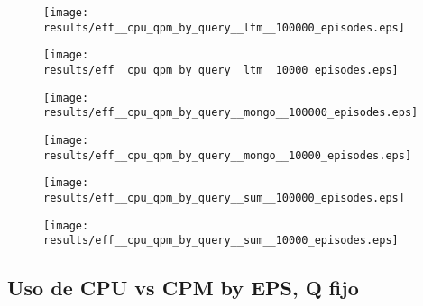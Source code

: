 \begin{figure}[H]
	\centering
	\texttt{[image: results/eff\_\_cpu\_qpm\_by\_query\_\_ltm\_\_100000\_episodes.eps]}
	\caption[]
	{\small }
	\label{img:result_eff__cpu_qpm_by_query__ltm__100000_episodes}
\end{figure}
\begin{figure}[H]
	\centering
	\texttt{[image: results/eff\_\_cpu\_qpm\_by\_query\_\_ltm\_\_10000\_episodes.eps]}
	\caption[]
	{\small }
	\label{img:result_eff__cpu_qpm_by_query__ltm__10000_episodes}
\end{figure}
\begin{figure}[H]
	\centering
	\texttt{[image: results/eff\_\_cpu\_qpm\_by\_query\_\_mongo\_\_100000\_episodes.eps]}
	\caption[]
	{\small }
	\label{img:result_eff__cpu_qpm_by_query__mongo__100000_episodes}
\end{figure}
\begin{figure}[H]
	\centering
	\texttt{[image: results/eff\_\_cpu\_qpm\_by\_query\_\_mongo\_\_10000\_episodes.eps]}
	\caption[]
	{\small }
	\label{img:result_eff__cpu_qpm_by_query__mongo__10000_episodes}
\end{figure}
\begin{figure}[H]
	\centering
	\texttt{[image: results/eff\_\_cpu\_qpm\_by\_query\_\_sum\_\_100000\_episodes.eps]}
	\caption[]
	{\small }
	\label{img:result_eff__cpu_qpm_by_query__sum__100000_episodes}
\end{figure}
\begin{figure}[H]
	\centering
	\texttt{[image: results/eff\_\_cpu\_qpm\_by\_query\_\_sum\_\_10000\_episodes.eps]}
	\caption[]
	{\small }
	\label{img:result_eff__cpu_qpm_by_query__sum__10000_episodes}
\end{figure}

\subsection{Uso de CPU vs CPM by EPS, Q fijo}


